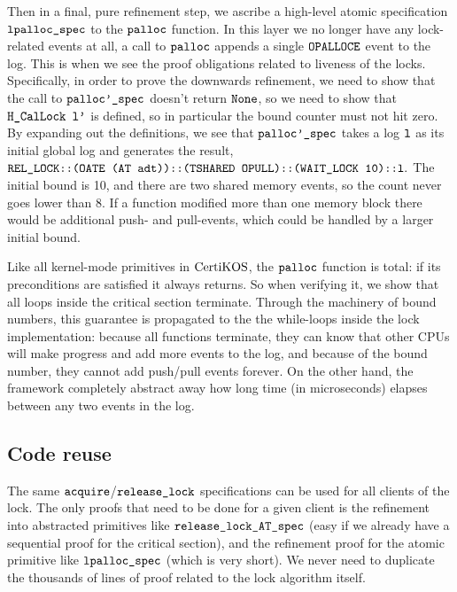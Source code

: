 Then in a final, pure refinement step, we ascribe a high-level atomic
specification ${\mathrm{\texttt{lpalloc\_spec}}}$ to the ${\mathrm{\texttt{palloc}}}$
function. In this layer we no longer have any lock-related events at
all, a call to ${\mathrm{\texttt{palloc}}}$ appends a single
${\mathrm{\texttt{OPALLOCE}}}$ event to the log. This is when we see the
proof obligations related to liveness of the locks.
Specifically, in order to prove the downwards refinement, we need to
show that the call to ${\mathrm{\texttt{palloc'\_spec}}}$ doesn't return
${\mathrm{\texttt{None}}}$, so we need to show that ${\mathrm{\texttt{H\_CalLock l'}}}$ is
defined, so in particular the bound counter must not hit zero.
By expanding out the definitions, we see that
${\mathrm{\texttt{palloc'\_spec}}}$ takes a log ${\mathrm{\texttt{l}}}$ as its initial global log
and generates the result,
${\texttt{REL$\_$LOCK::(OATE (AT adt))::(TSHARED OPULL)::(WAIT$\_$LOCK 10)::l}}.$
The initial bound is 10, and there are two shared memory events, so the
count never goes lower than 8. If a function modified more than one
memory block there would be additional push- and pull-events, which
could be handled by a larger initial bound.

Like all kernel-mode primitives in $\mathrm{CertiKOS}$, the ${\mathrm{\texttt{palloc}}}$ function is
total: if its preconditions are satisfied it always returns. So
when verifying it, we show that all loops inside the critical section
terminate. Through the machinery of bound numbers, this guarantee is
propagated to the the while-loops inside the lock implementation:
because all functions terminate, they can know that other CPUs will
make progress and add more events to the log, and because of the
bound number, they cannot add push/pull events forever. On the other
hand, the framework completely abstract away how long time (in microseconds) elapses
between any two events in the log.

\subsection{Code reuse} 
The same
${\mathrm{\texttt{acquire}}}$/${\mathrm{\texttt{release\_lock}}}$ specifications can be
used for all clients of the lock. The only proofs that need to be done
for a given client is the refinement into abstracted primitives like
${\mathrm{\texttt{release\_lock\_AT\_spec}}}$ (easy if we already have a sequential
proof for the critical section), and the refinement proof for the
atomic primitive like ${\mathrm{\texttt{lpalloc\_spec}}}$ (which is very
short). We never need to duplicate the thousands of lines of proof
related to the lock algorithm itself.

